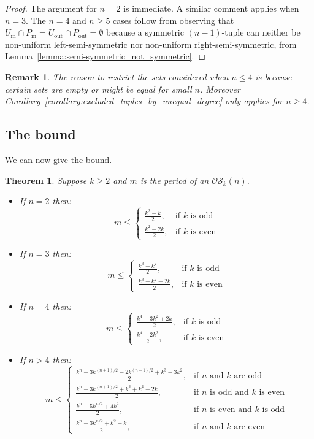\documentclass[a4paper,11pt]{article}
\newtheorem{theorem}[lemma]{Theorem}
\newtheorem{remark}[lemma]{Remark}
\begin{document}
\begin{proof}
The argument for $n=2$ is immediate. A similar comment applies when $n=3$.  The $n=4$ and $n \ge 5$
cases follow from observing that $U_{\text{in}}\cap P_{\text{in}}=U_{\text{out}}\cap
P_{\text{out}}=\emptyset$ because a symmetric $(n-1)$-tuple can neither be non-uniform
left-semi-symmetric nor non-uniform right-semi-symmetric, from
Lemma~\ref{lemma:semi-symmetric_not_symmetric}.
\end{proof}


\begin{remark}
The reason to restrict the sets considered when $n\leq 4$ is because certain sets are empty or
might be equal for small $n$.  Moreover Corollary~\ref{corollary:excluded_tuples_by_unequal_degree}
only applies for $n\geq4$.
\end{remark}

\subsection{The bound}

We can now give the bound.


\begin{theorem} \label{theorem:OS_bound_4}
Suppose $k\geq2$ and $m$ is the period of an $\mathcal{OS}_k(n)$.
\begin{itemize}
\item[i)] If $n=2$ then:
\[ m \leq \begin{cases}
\frac{k^2-k}{2}, & \text{if $k$ is odd} \\
\frac{k^2-2k}{2}, & \text{if $k$ is even}
\end{cases} \]
\item[ii)] If $n=3$ then:
\[ m \leq \begin{cases}
\frac{k^3-k^2}{2}, & \text{if $k$ is odd} \\
\frac{k^3-k^2-2k}{2}, & \text{if $k$ is even}
\end{cases} \]
\item[iii)] If $n=4$ then:
\[ m \leq \begin{cases}
\frac{k^4-3k^2+2k}{2}, & \text{if $k$ is odd} \\
\frac{k^4-2k^2}{2}, & \text{if $k$ is even}
\end{cases}\]
\item[iv)] If $n>4$ then:
\[ m \leq \begin{cases}
\frac{k^n-3k^{(n+1)/2}-2k^{(n-1)/2}+k^3+3k^2}{2}, & \text{if $n$ and $k$ are odd} \\
\frac{k^n-3k^{(n+1)/2}+k^3+k^2-2k}{2}, & \text{if $n$ is odd and $k$ is even} \\
\frac{k^n-5k^{n/2}+4k^2}{2}, & \text{if $n$ is even and $k$ is odd} \\
\frac{k^n-3k^{n/2}+k^2-k}{2}, & \text{if $n$ and $k$ are even}
\end{cases}\]

\end{itemize}

\end{theorem}
\end{document}
